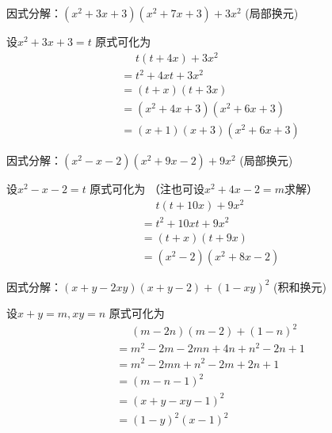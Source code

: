 \documentclass[windows,csize4,answers]{BHCexam}
\begin{document}
\begin{groups}
\begin{questions}[]
        \question[5] 因式分解：$(x^2+3x+3)(x^2+7x+3)+3x^2$ (局部换元)
        \begin{solution}{0.5cm}
            \methodonly 设$x^2+3x+3=t$ 原式可化为
            \[
                \begin{aligned}
                     & \phantom{=}t(t+4x)+3x^2 \\
                     & = t^2+4xt+3x^2          \\
                     & = (t+x)(t+3x) \\ 
                     & = (x^2+4x+3)(x^2+6x+3)  \\
                     & = (x+1)(x+3)(x^2+6x+3)
                \end{aligned}
            \]
        \end{solution}
        \vspace{3.5cm}

        \question[5] 因式分解：$(x^2-x-2)(x^2+9x-2)+9x^2$ (局部换元)
        \begin{solution}{0.5cm}
            \methodonly 设$x^2-x-2=t$ 原式可化为 （注也可设$x^2+4x-2=m$求解）
            \[
                \begin{aligned}
                     & \phantom{=}t(t+10x)+9x^2 \\
                     & = t^2+10xt+9x^2          \\
                     & = (t+x)(t+9x)            \\
                     & = (x^2-2)(x^2+8x-2)
                \end{aligned}
            \]
        \end{solution}
        \vspace{3.5cm}

        \question[5] 因式分解：$(x+y-2xy)(x+y-2)+(1-xy)^2$ (积和换元)
        \begin{solution}{0.5cm}
            \methodonly 设$x+y=m,xy=n$ 原式可化为
            \[
                \begin{aligned}
                     & \phantom{=}(m-2n)(m-2)+(1-n)^2 \\
                     & = m^2-2m-2mn+4n+n^2-2n+1       \\
                     & = m^2-2mn+n^2-2m+2n+1          \\ %
                     & = (m-n-1)^2                    \\
                     & = (x+y-xy-1)^2                 \\
                     & = (1-y)^2(x-1)^2
                \end{aligned}
            \]
        \end{solution}
        \vspace{3.5cm}


\end{questions}
\end{groups}
\end{document}
